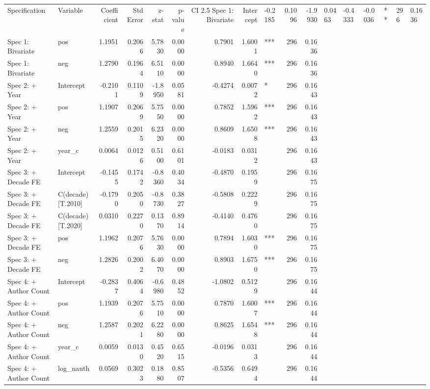 \begin{tabular}{llrrrrrrlrr}
\toprule
Specification & Variable & Coefficient & Std Error & z-stat & p-value & CI 2.5%
\midrule
Spec 1: Bivariate & Intercept & -0.2185 & 0.1096 & -1.9930 & 0.0463 & -0.4333 & -0.0036 & ** & 296 & 0.1636 \\
Spec 1: Bivariate & pos & 1.1951 & 0.2066 & 5.7830 & 0.0000 & 0.7901 & 1.6001 & *** & 296 & 0.1636 \\
Spec 1: Bivariate & neg & 1.2790 & 0.1964 & 6.5110 & 0.0000 & 0.8940 & 1.6640 & *** & 296 & 0.1636 \\
Spec 2: + Year & Intercept & -0.2101 & 0.1109 & -1.8950 & 0.0581 & -0.4274 & 0.0072 & * & 296 & 0.1643 \\
Spec 2: + Year & pos & 1.1907 & 0.2069 & 5.7550 & 0.0000 & 0.7852 & 1.5962 & *** & 296 & 0.1643 \\
Spec 2: + Year & neg & 1.2559 & 0.2015 & 6.2320 & 0.0000 & 0.8609 & 1.6508 & *** & 296 & 0.1643 \\
Spec 2: + Year & year_c & 0.0064 & 0.0126 & 0.5100 & 0.6101 & -0.0183 & 0.0312 &  & 296 & 0.1643 \\
Spec 3: + Decade FE & Intercept & -0.1455 & 0.1742 & -0.8360 & 0.4034 & -0.4870 & 0.1959 &  & 296 & 0.1675 \\
Spec 3: + Decade FE & C(decade)[T.2010] & -0.1790 & 0.2050 & -0.8730 & 0.3827 & -0.5808 & 0.2229 &  & 296 & 0.1675 \\
Spec 3: + Decade FE & C(decade)[T.2020] & 0.0310 & 0.2270 & 0.1370 & 0.8914 & -0.4140 & 0.4760 &  & 296 & 0.1675 \\
Spec 3: + Decade FE & pos & 1.1962 & 0.2076 & 5.7630 & 0.0000 & 0.7894 & 1.6030 & *** & 296 & 0.1675 \\
Spec 3: + Decade FE & neg & 1.2826 & 0.2002 & 6.4070 & 0.0000 & 0.8903 & 1.6750 & *** & 296 & 0.1675 \\
Spec 4: + Author Count & Intercept & -0.2837 & 0.4064 & -0.6980 & 0.4852 & -1.0802 & 0.5129 &  & 296 & 0.1644 \\
Spec 4: + Author Count & pos & 1.1939 & 0.2076 & 5.7510 & 0.0000 & 0.7870 & 1.6007 & *** & 296 & 0.1644 \\
Spec 4: + Author Count & neg & 1.2587 & 0.2021 & 6.2280 & 0.0000 & 0.8625 & 1.6548 & *** & 296 & 0.1644 \\
Spec 4: + Author Count & year_c & 0.0059 & 0.0130 & 0.4520 & 0.6515 & -0.0196 & 0.0313 &  & 296 & 0.1644 \\
Spec 4: + Author Count & log_nauth & 0.0569 & 0.3023 & 0.1880 & 0.8507 & -0.5356 & 0.6494 &  & 296 & 0.1644 \\

\end{tabular}
